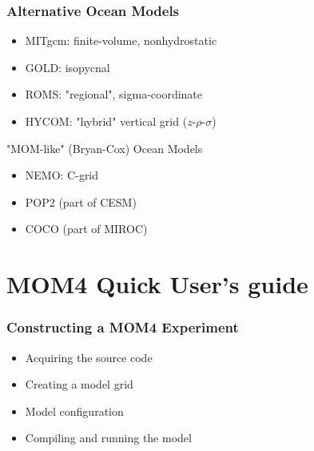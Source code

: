 \documentclass[red]{beamer}
\begin{document}
\begin{frame}
    \frametitle{Alternative Ocean Models}
    
    \begin{itemize}
        \item MITgcm: finite-volume, nonhydrostatic
        \item GOLD: isopycnal
        \item ROMS: "regional", sigma-coordinate
        \item HYCOM: "hybrid" vertical grid ($z$-$\rho$-$\sigma$)
    \end{itemize}
    
    "MOM-like" (Bryan-Cox) Ocean Models
    \begin{itemize}
        \item NEMO: C-grid
        \item POP2 (part of CESM)
        \item COCO (part of MIROC)
    \end{itemize}
\end{frame}

\section{MOM4 Quick User's guide}
\begin{frame}
    \frametitle{Constructing a MOM4 Experiment}
    
    \begin{itemize}
        \item Acquiring the source code
        \item Creating a model grid
        \item Model configuration
        \item Compiling and running the model
    \end{itemize}

\end{frame}
\end{document}

